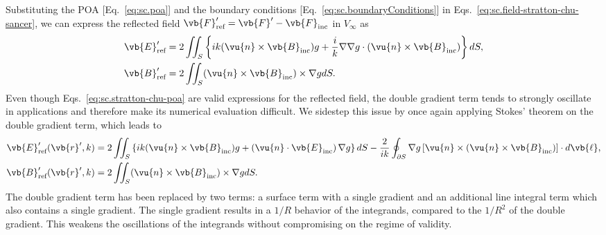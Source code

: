 \documentclass[11pt,SymmetricalJury]{inrsthesis/inrsthesis}
\begin{document}
Substituting the POA [Eq.~\eqref{eq:sc.poa}] and the boundary conditions
[Eq.~\eqref{eq:sc.boundaryConditions}] in Eqs.~\eqref{eq:sc.field-stratton-chu-sancer},
we can express the reflected field $\vb{F}'_\text{ref}=\vb{F}'-\vb{F}_\text{inc}$
in $V_\infty$ as
  \begin{subequations}
  \label{eq:sc.stratton-chu-poa}
  \begin{align}
    \label{eq:sc.stratton-chu-poa.efield}
    \vb{E}'_\text{ref}  &=  2\iint_S
      \left\{
        ik(\vu{n}\times\vb{B}_\text{inc})g
        +\frac{i}{k}\nabla\nabla g\cdot(\vu{n}\times\vb{B}_\text{inc})
        \right\}dS, \\
    \label{eq:sc.stratton-chu-poa.bfield}
    \vb{B}'_\text{ref}  &= 2\iint_S (\vu{n}\times\vb{B}_\text{inc})\times\nabla g dS.
  \end{align}
  \end{subequations}
Even though Eqs.~\eqref{eq:sc.stratton-chu-poa} are valid expressions
for the reflected field, the double gradient term tends to strongly oscillate in applications and therefore
make its numerical evaluation difficult. We sidestep this issue by once again applying
Stokes' theorem on the double gradient term, which leads to
  \begin{subequations}
  \label{eq:sc.stratton-chu-poa-og}
  \begin{align}
    \label{eq:sc.stratton-chu-poa-og.efield}
    \vb{E}'_\text{ref}(\vb{r}',k)  &= 2\iint_S
      \left\{
        ik(\vu{n}\times\vb{B}_\text{inc})g
        +\left(\vu{n}\cdot\vb{E}_\text{inc}\right)\nabla g
        \right\}dS
            - \frac{2}{ik}\oint_{\partial S}\nabla g
                    \left[\vu{n}\times(\vu{n}\times\vb{B}_\text{inc})\right]\cdot d\vb{\ell},\\
    \label{eq:sc.stratton-chu-poa-og.bfield}
    \vb{B}'_\text{ref}(\vb{r}',k)  &= 2\iint_S (\vu{n}\times\vb{B}_\text{inc})\times\nabla g dS.
  \end{align}
  \end{subequations}
The double gradient term has been replaced by two terms: a surface term with a
single gradient and an additional line integral term  which also contains
a single gradient. The single gradient results in a $1/R$ behavior of the integrands,
compared to the $1/R^2$ of the double gradient. This weakens the oscillations of
the integrands without compromising on the regime of validity.
\end{document}
